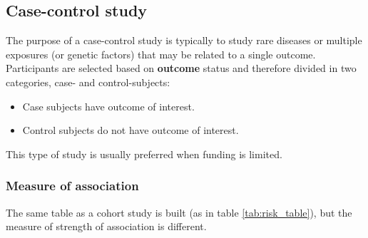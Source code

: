 	\subsection{Case-control study}
	The purpose of a case-control study is typically to study rare diseases or multiple exposures (or genetic factors) that may be related to a single outcome.
	Participants are selected based on \textbf{outcome} status and therefore divided in two categories, case- and control-subjects:

	\begin{multicols}{2}
		\begin{itemize}
			\item Case subjects have outcome of interest.
			\item Control subjects do not have outcome of interest.
		\end{itemize}
	\end{multicols}

	This type of study is usually preferred when funding is limited.

		\subsubsection{Measure of association}
		The same table as a cohort study is built (as in table \ref{tab:risk_table}), but the measure of strength of association is different.
		

